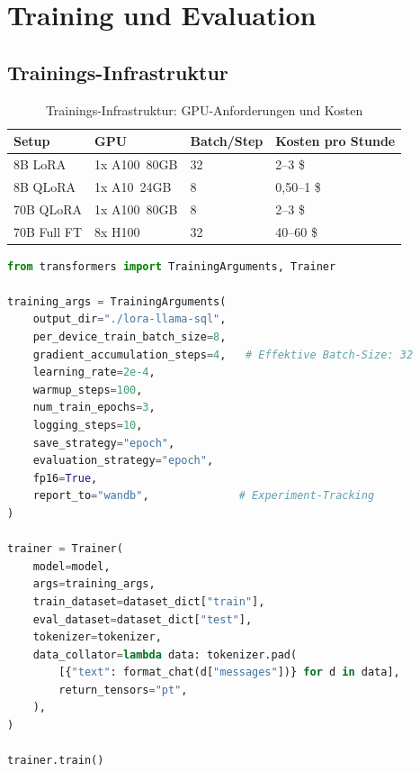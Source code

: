 \section{Training und Evaluation}

\subsection{Trainings-Infrastruktur}

\begin{table}[H]
\centering
\begin{tabularx}{\linewidth}{lXXX}
\toprule
\textbf{Setup} & \textbf{GPU} & \textbf{Batch/Step} & \textbf{Kosten pro Stunde} \\
\midrule
8B LoRA & 1x A100~80GB & 32 & 2--3 \$ \\
8B QLoRA & 1x A10~24GB & 8 & 0,50--1 \$ \\
70B QLoRA & 1x A100~80GB & 8 & 2--3 \$ \\
70B Full FT & 8x H100 & 32 & 40--60 \$ \\
\bottomrule
\end{tabularx}
\caption{Trainings-Infrastruktur: GPU-Anforderungen und Kosten}
\protect\label{tab:train-setup}
\end{table}

\begin{lstlisting}[language=Python, caption=Fine-Tuning mit Hugging Face Trainer]
from transformers import TrainingArguments, Trainer

training_args = TrainingArguments(
    output_dir="./lora-llama-sql",
    per_device_train_batch_size=8,
    gradient_accumulation_steps=4,   # Effektive Batch-Size: 32
    learning_rate=2e-4,
    warmup_steps=100,
    num_train_epochs=3,
    logging_steps=10,
    save_strategy="epoch",
    evaluation_strategy="epoch",
    fp16=True,
    report_to="wandb",              # Experiment-Tracking
)

trainer = Trainer(
    model=model,
    args=training_args,
    train_dataset=dataset_dict["train"],
    eval_dataset=dataset_dict["test"],
    tokenizer=tokenizer,
    data_collator=lambda data: tokenizer.pad(
        [{"text": format_chat(d["messages"])} for d in data],
        return_tensors="pt",
    ),
)

trainer.train()
\end{lstlisting}

